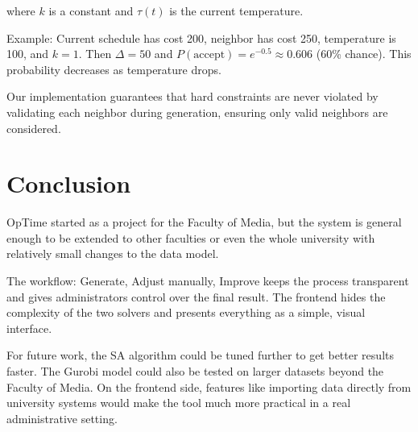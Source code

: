\documentclass[11pt,a4paper]{article}
\begin{document}
where $k$ is a constant and $\tau(t)$ is the current temperature.

Example: Current schedule has cost 200, neighbor has cost 250, temperature is 100, and $k=1$. Then $\Delta = 50$ and $P(\text{accept}) = e^{-0.5} \approx 0.606$ (60\% chance). This probability decreases as temperature drops.

Our implementation guarantees that hard constraints are never violated by validating each neighbor during generation, ensuring only valid neighbors are considered.

\section{Conclusion}
OpTime started as a project for the Faculty of Media, but the system is general enough to be extended to other faculties or even the whole university with relatively small changes to the data model.

The workflow: Generate, Adjust manually, Improve keeps the process transparent and gives administrators control over the final result. The frontend hides the complexity of the two solvers and presents everything as a simple, visual interface.


For future work, the SA algorithm could be tuned further to get better results faster. The Gurobi model could also be tested on larger datasets beyond the Faculty of Media. On the frontend side, features like importing data directly from university systems would make the tool much more practical in a real administrative setting.

\printbibliography
\end{document}
